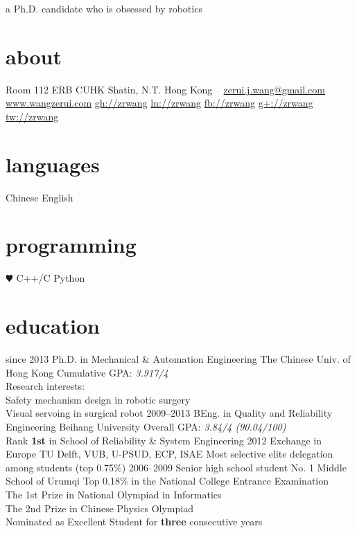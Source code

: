 \documentclass[]{friggeri-cv}
\begin{document}
       {a Ph.D. candidate who is obsessed by robotics}


\begin{aside}
  \section{about}
    Room 112
    ERB
    CUHK
    Shatin, N.T.
    Hong Kong
    ~
    \href{mailto:zerui.j.wang@gmail.com}{zerui.j.wang@gmail.com}
    \href{http://www.wangzerui.com}{www.wangzerui.com}
    \href{https://github.com/zrwang}{gh://zrwang}
    \href{https://www.linkedin.com/in/zrwang}{ln://zrwang}
    \href{https://www.facebook.com/zrwang.cuhk}{fb://zrwang}
    \href{https://plus.google.com/u/0/115306810481973645007/posts}{g+://zrwang}
    \href{https://twitter.com/wangzerui}{tw://zrwang}
  \section{languages}
    Chinese
    English
  \section{programming}
    {\color{red} $\varheartsuit$} C++/C
    Python
\end{aside}

\section{education}
\begin{entrylist}
  \entry
    {since 2013}
    {Ph.D. {\normalfont in Mechanical \& Automation Engineering}}
    {The Chinese Univ. of Hong Kong}
    {Cumulative GPA: \emph{3.917/4} \\
     Research interests: \\
     Safety mechanism design in robotic surgery \\
     Visual servoing in surgical robot}
  \entry
    {2009–2013}
    {BEng. {\normalfont in Quality and Reliability Engineering}}
    {Beihang University}
    {Overall GPA: \emph{3.84/4 (90.04/100)} \\
     Rank \textbf{1st} in School of Reliability \& System Engineering}
  \entry
    {2012}
    {Exchange {\normalfont in Europe}}
    {TU Delft, VUB, U-PSUD, ECP, ISAE}
    {Most selective elite delegation among students (top 0.75\%)}
  \entry
    {2006–2009}
    {Senior high school student}
    {No. 1 Middle School of Urumqi}
    {Top 0.18\%  in the National College Entrance Examination \\
    The 1st Prize in National Olympiad in Informatics \\
    The 2nd Prize in Chinese Physics Olympiad \\
    Nominated as Excellent Student for \textbf{three} consecutive years}
\end{entrylist}
\end{document}
